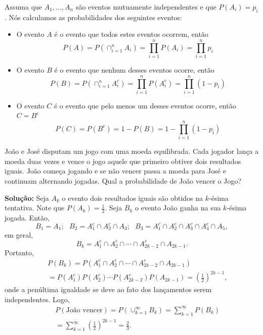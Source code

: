 \begin{frame}

\begin{exer}
Assuma que $A_1,\ldots, A_n$ são eventos mutuamente independentes e
que $P(A_i)=p_i$. Nós calculamos as probabilidades dos seguintes
eventos:
\begin{itemize}
\item O evento $A$ é o evento que todos estes eventos ocorrem, então
%
$$P(A)=P(\cap_{i=1}^{n}A_i)=\prod_{i=1}^{n}P(A_i)=\prod_{i=1}^{n}p_i$$

\item O evento $B$ é o evento que nenhum desses eventos ocorre,
então
%
$$P(B)=P(\cap_{i=1}^{n}A_i^c)=\prod_{i=1}^{n}P(A_i^c)=\prod_{i=1}^{n}(1-p_i)$$

\item O evento $C$ é o evento que pelo menos um desses eventos ocorre,
então $C=B^c$
%
$$P(C)=P(B^c)=1-P(B)=1-\prod_{i=1}^{n}(1-p_i)$$
\end{itemize}
\end{exer}

\end{frame}


\begin{frame}
\begin{exem}
João e José disputam um jogo com uma moeda equilibrada. Cada jogador lança a moeda duas vezes e vence o jogo aquele que primeiro obtiver dois resultados iguais. João começa jogando e se não vencer passa a moeda para José e continuam alternando jogadas. Qual a probabilidade de João vencer o Jogo?
\end{exem}

{\bf Solução:} Seja $A_k$ o evento dois resultados iguais são obtidos na $k$-ésima tentativa. Note que $P(A_k)=\frac{1}{2}$. Seja $B_k$ o evento João ganha na sua $k$-ésima jogada. Então,
$$B_1=A_1;\mbox{ }B_2=A_1^c\cap A_2^c\cap A_3;\mbox{ }B_3=A_1^c\cap A_2^c\cap A_3^c\cap A_4^c\cap A_5,$$
em geral,
$$B_k=A_1^c\cap A_2^c\cap\cdots\cap A_{2k-2}^c\cap A_{2k-1}.$$
Portanto,
\begin{eqnarray}
& & P(B_k)=P(A_1^c\cap A_2^c\cap\cdots\cap A_{2k-2}^c\cap A_{2k-1}) \nonumber \\
& & =P(A_1^c)P(A_2^c)\cdots P(A_{2k-2}^c)P(A_{2k-1})=(\frac{1}{2})^{2k-1}, \nonumber
\end{eqnarray}
onde a penúltima igualdade se deve ao fato dos lançamentos serem independentes. Logo,
\begin{eqnarray}
& & P(\mbox{João vencer})=P(\cup_{k=1}^{\infty}B_k)=\sum_{k=1}^{\infty}P(B_k) \nonumber \\
& & =\sum_{k=1}^{\infty}(\frac{1}{2})^{2k-1}=\frac{2}{3}. \nonumber
\end{eqnarray}
\end{frame}





